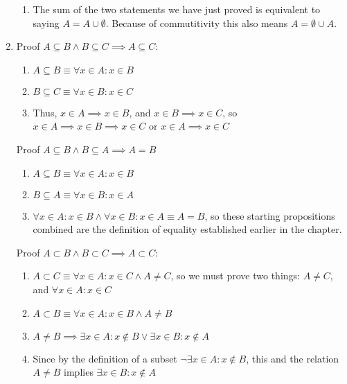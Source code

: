 \documentclass{article}
\begin{document}
\begin{enumerate}
\begin{enumerate}
                \item The sum of the two statements we have just proved is equivalent to saying $A = A \cup \emptyset$.
                    Because of commutitivity this also means $A = \emptyset \cup A$.
            \end{enumerate}
        \item Proof $A \subseteq B \land B \subseteq C \implies A \subseteq C$:
            \begin{enumerate}
                \item $A \subseteq B \equiv \forall x \in A : x \in B$
                \item $B \subseteq C \equiv \forall x \in B : x \in C$
                \item Thus, $x \in A \implies x \in B$, and $x \in B \implies x \in C$,
                    so $x \in A \implies x \in B \implies x \in C$ or $x \in A \implies x \in C$
            \end{enumerate}
            Proof $A \subseteq B \land B \subseteq A \implies A = B$
            \begin{enumerate}
                \item $A \subseteq B \equiv \forall x \in A : x \in B$
                \item $B \subseteq A \equiv \forall x \in B : x \in A$
                \item $\forall x \in A: x \in B \land \forall x \in B: x \in A
                    \equiv A = B$, so these starting propositions combined are
                    the definition of equality established earlier in the
                    chapter.
            \end{enumerate}
            Proof $A \subset B \land B \subset C \implies A \subset C$:
            \begin{enumerate}
                \item $A \subset C \equiv \forall x \in A: x \in C \land A \neq C$, so we must prove
                    two things: $A \neq C$, and $\forall x \in A: x \in C$
                \item $A \subset B \equiv \forall x \in A: x \in B \land A \neq B$
                \item $A \neq B \implies \exists x \in A: x \notin B \lor \exists x \in B: x \notin A$
                \item Since by the definition of a subset $\neg\exists x \in A:
                    x \notin B$, this and the relation $A \neq B$ implies
                    $\exists x \in B: x \notin A$

\end{enumerate}
\end{enumerate}
\end{document}
